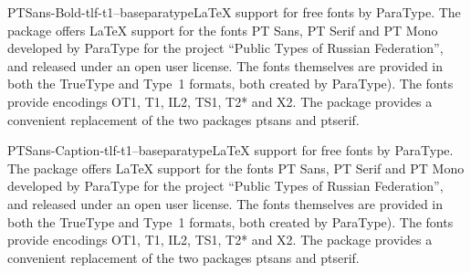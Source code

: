 \documentclass{ddltxtyp}
\begin{document}
\begin{package}{PTSans-Bold-tlf-t1--base}{paratype}{{\LaTeX} support for free fonts by ParaType.}
The package offers {\LaTeX} support for the fonts PT Sans, PT
Serif and PT Mono developed by ParaType for the project ``Public
Types of Russian Federation'', and released under an open user
license. The fonts themselves are provided in both the TrueType
and Type~1 formats, both created by ParaType). The fonts
provide encodings OT1, T1, IL2, TS1, T2* and X2. The package
provides a convenient replacement of the two packages ptsans
and ptserif.
\end{package}
\begin{package}{PTSans-Caption-tlf-t1--base}{paratype}{{\LaTeX} support for free fonts by ParaType.}
The package offers {\LaTeX} support for the fonts PT Sans, PT
Serif and PT Mono developed by ParaType for the project ``Public
Types of Russian Federation'', and released under an open user
license. The fonts themselves are provided in both the TrueType
and Type~1 formats, both created by ParaType). The fonts
provide encodings OT1, T1, IL2, TS1, T2* and X2. The package
provides a convenient replacement of the two packages ptsans
and ptserif.
\end{package}
\end{document}
